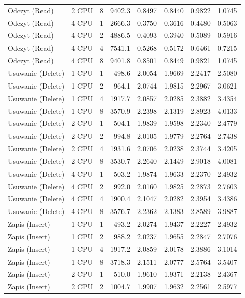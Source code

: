 \begin{table}[ht]
{\begin{tabular}{llcrrrrr}
Odczyt (Read) & 2 CPU & 8 & 9402.3 & 0.8497 & 0.8440 & 0.9822 & 1.0745 \\
Odczyt (Read) & 4 CPU & 1 & 2666.3 & 0.3750 & 0.3616 & 0.4480 & 0.5063 \\
Odczyt (Read) & 4 CPU & 2 & 4886.5 & 0.4093 & 0.3940 & 0.5089 & 0.5916 \\
Odczyt (Read) & 4 CPU & 4 & 7541.1 & 0.5268 & 0.5172 & 0.6461 & 0.7215 \\
Odczyt (Read) & 4 CPU & 8 & 9401.8 & 0.8501 & 0.8449 & 0.9821 & 1.0745 \\
Usuwanie (Delete) & 1 CPU & 1 & 498.6 & 2.0054 & 1.9669 & 2.2417 & 2.5080 \\
Usuwanie (Delete) & 1 CPU & 2 & 964.1 & 2.0744 & 1.9815 & 2.2967 & 3.0621 \\
Usuwanie (Delete) & 1 CPU & 4 & 1917.7 & 2.0857 & 2.0285 & 2.3882 & 3.4354 \\
Usuwanie (Delete) & 1 CPU & 8 & 3570.9 & 2.2398 & 2.1319 & 2.8923 & 4.0133 \\
Usuwanie (Delete) & 2 CPU & 1 & 504.1 & 1.9839 & 1.9598 & 2.2340 & 2.4779 \\
Usuwanie (Delete) & 2 CPU & 2 & 994.8 & 2.0105 & 1.9779 & 2.2764 & 2.7438 \\
Usuwanie (Delete) & 2 CPU & 4 & 1931.6 & 2.0706 & 2.0238 & 2.3744 & 3.4205 \\
Usuwanie (Delete) & 2 CPU & 8 & 3530.7 & 2.2640 & 2.1449 & 2.9018 & 4.0081 \\
Usuwanie (Delete) & 4 CPU & 1 & 503.2 & 1.9874 & 1.9633 & 2.2370 & 2.4932 \\
Usuwanie (Delete) & 4 CPU & 2 & 992.0 & 2.0160 & 1.9825 & 2.2873 & 2.7603 \\
Usuwanie (Delete) & 4 CPU & 4 & 1900.4 & 2.1047 & 2.0282 & 2.3954 & 3.4386 \\
Usuwanie (Delete) & 4 CPU & 8 & 3576.7 & 2.2362 & 2.1383 & 2.8589 & 3.9887 \\
Zapis (Insert) & 1 CPU & 1 & 493.2 & 2.0274 & 1.9437 & 2.2227 & 2.4932 \\
Zapis (Insert) & 1 CPU & 2 & 988.2 & 2.0237 & 1.9655 & 2.2847 & 2.7076 \\
Zapis (Insert) & 1 CPU & 4 & 1917.2 & 2.0859 & 2.0178 & 2.3886 & 3.1014 \\
Zapis (Insert) & 1 CPU & 8 & 3718.3 & 2.1511 & 2.0777 & 2.5764 & 3.5407 \\
Zapis (Insert) & 2 CPU & 1 & 510.0 & 1.9610 & 1.9371 & 2.2138 & 2.4367 \\
Zapis (Insert) & 2 CPU & 2 & 1004.7 & 1.9907 & 1.9632 & 2.2561 & 2.5977 \\

\end{tabular}}
\end{table}
